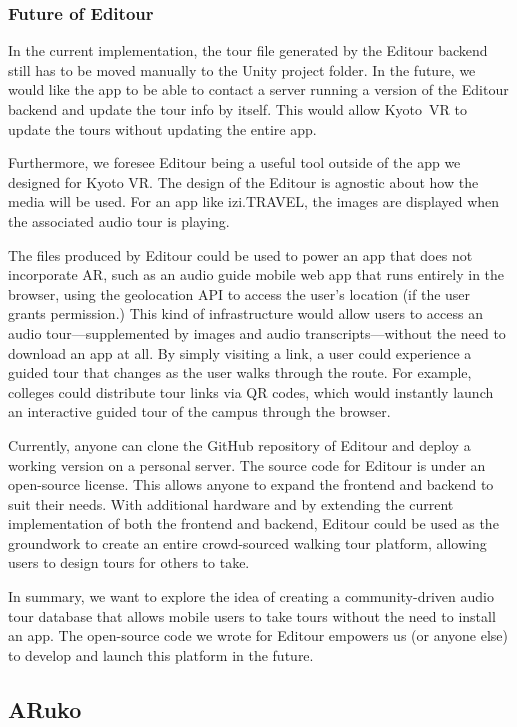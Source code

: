 \documentclass[a4paper, 10pt, american, titlepage]{article}
\begin{document}
\subsubsection{Future of Editour}
\label{sec:futureOfEditour}

In the current implementation, the tour file generated by the Editour backend
still has to be moved manually to the Unity project folder. In the future, we
would like the app to be able to contact a server running a version of the
Editour backend and update the tour info by itself. This would allow Kyoto~VR to
update the tours without updating the entire app.

Furthermore, we foresee Editour being a useful tool outside of the app we
designed for Kyoto VR. The design of the Editour is agnostic about how the media
will be used. For an app like izi.TRAVEL, the images are displayed when the
associated audio tour is playing.

The files produced by Editour could be used to power an app that does not
incorporate AR, such as an audio guide mobile web app that runs entirely in the
browser, using the geolocation API to access the user's location (if the user
grants permission.) This kind of infrastructure would allow users to access an
audio tour---supplemented by images and audio transcripts---without the need to
download an app at all. By simply visiting a link, a user could experience a
guided tour that changes as the user walks through the route. For example,
colleges could distribute tour links via QR codes, which would instantly launch
an interactive guided tour of the campus through the browser.

Currently, anyone can clone the GitHub repository of Editour and deploy a
working version on a personal server. The source code for Editour is under an
open-source license. This allows anyone to expand the frontend and backend to
suit their needs. With additional hardware and by extending the current
implementation of both the frontend and backend, Editour could be used as the
groundwork to create an entire crowd-sourced walking tour platform, allowing
users to design tours for others to take.

In summary, we want to explore the idea of creating a community-driven audio
tour database that allows mobile users to take tours without the need to install
an app. The open-source code we wrote for Editour empowers us (or anyone else)
to develop and launch this platform in the future.

\subsection{ARuko}
\label{sec:aruko}
\end{document}
